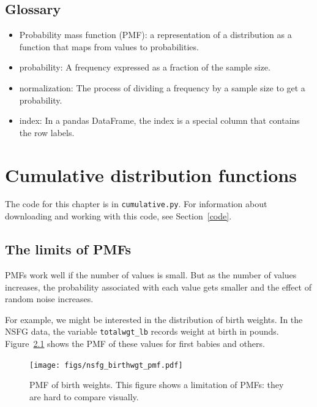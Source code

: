 \documentclass[12pt]{book}
\theoremstyle{exercise}
\begin{document}
\section{Glossary}

\begin{itemize}

\item Probability mass function (PMF): a representation of a distribution
as a function that maps from values to probabilities.%
%

\item probability: A frequency expressed as a fraction of the sample
size.%
%

\item normalization: The process of dividing a frequency by a sample
size to get a probability.%

\item index: In a pandas DataFrame, the index is a special column
that contains the row labels.%
%

\end{itemize}


\chapter{Cumulative distribution functions}%
\label{cumulative}

The code for this chapter is in {\tt cumulative.py}.
For information about downloading and
working with this code, see Section~\ref{code}.


\section{The limits of PMFs}%

PMFs work well if the number of values is small.  But as the number of
values increases, the probability associated with each value gets
smaller and the effect of random noise increases.

For example, we might be interested in the distribution of birth
weights.  In the NSFG data, the variable \verb"totalwgt_lb" records
weight at birth in pounds.  Figure~\ref{nsfg_birthwgt_pmf} shows
the PMF of these values for first babies and others.%
%
%
%

\begin{figure}
\centerline{\texttt{[image: figs/nsfg\_birthwgt\_pmf.pdf]}}
\caption{PMF of birth weights.  This figure shows a limitation
of PMFs: they are hard to compare visually.}%
\label{nsfg_birthwgt_pmf}
\end{figure}
\end{document}
